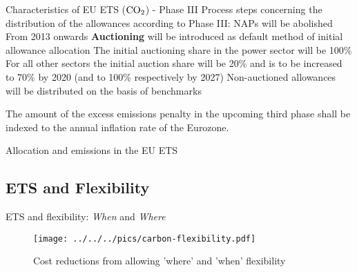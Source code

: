 Characteristics of EU ETS ($\textnormal{CO}_2$) - Phase III
  Process steps concerning the distribution of the allowances according to Phase III:
		NAPs will be abolished
		From 2013 onwards \textbf{Auctioning} will be introduced as default method of initial allowance allocation
		The initial auctioning share  in the power sector will be 100\%
		For all other sectors the initial auction share will be 20\% and is to be increased to 70\% by 2020 (and to 100\% respectively by 2027)
		Non-auctioned allowances will be distributed on the basis of benchmarks
  
  
	The amount of the excess emissions penalty in the upcoming third phase shall be indexed to the annual inflation rate of the Eurozone.  %
  

Allocation and emissions in the EU ETS
	\begin{center}
	\begin{figure}[h!]
	\centering
	\label{fig:plot1}
	\end{figure}
	\end{center}


\subsection{ETS and Flexibility}

ETS and flexibility: {\it When} and {\it Where}
	\begin{center}
	\begin{figure}[h!]
	\centering
	\texttt{[image: ../../../pics/carbon-flexibility.pdf]}
	\caption{Cost reductions from allowing 'where' and 'when' flexibility}
	\label{fig:emmissions}
	\end{figure}
	\end{center}


